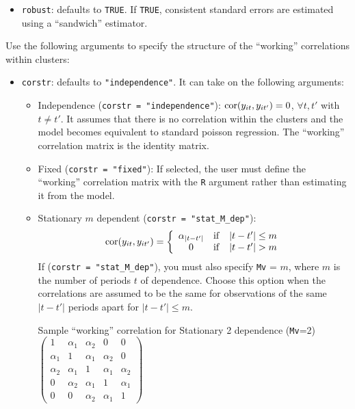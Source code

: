 \begin{itemize}
\item \texttt{robust}: defaults to \texttt{TRUE}.  If \texttt{TRUE}, consistent standard errors are estimated using a ``sandwich'' estimator.
\end{itemize}
Use the following arguments to specify the structure of the ``working'' correlations within clusters:

\begin{itemize}
\item \texttt{corstr}: defaults to {\tt "independence"}.  It can take on the following arguments:
\begin{itemize}
\item Independence (\texttt{corstr = "independence"}): ${\rm
    cor}(y_{it}, y_{it'})=0$, $\forall t, t'$ with $t\ne t'$.  It assumes that there is no correlation within the clusters and the model becomes equivalent to standard poisson regression.  The ``working'' correlation matrix is the identity matrix.
\item Fixed (\texttt{corstr = "fixed"}): If selected, the user must define the ``working'' correlation matrix with the \texttt{R} argument rather than estimating it from the model.
\item Stationary $m$ dependent (\texttt{corstr = "stat\_M\_dep"}):
  $${\rm cor}(y_{it}, y_{it'})=\left\{\begin{array}{ccc}
      \alpha_{|t-t'|} & {\rm if} & |t-t'|\le m \\ 0 & {\rm if}
      & |t-t'| > m
    \end{array}\right.$$
  If (\texttt{corstr = "stat\_M\_dep"}), you must also specify \texttt{Mv} = $m$, where $m$
is the number of periods $t$ of dependence.  Choose this option when the correlations are assumed to be the same for observations of the same $|t-t'|$ periods apart for $|t-t'| \leq m$.
\begin{center}
Sample ``working'' correlation for Stationary 2 dependence ({\tt Mv}=2)\\
\bigskip
$\left( \begin{array}{ccccc}
1 & \alpha_1 & \alpha_2 & 0 & 0 \\
\alpha_1 & 1 & \alpha_1 & \alpha_2 & 0 \\
\alpha_2 & \alpha_1 & 1 & \alpha_1 & \alpha_2 \\
0 & \alpha_2 & \alpha_1 & 1 & \alpha_1 \\
0 & 0 & \alpha_2 & \alpha_1 & 1
\end{array} \right) $
\end{center}


\end{itemize}
\end{itemize}
